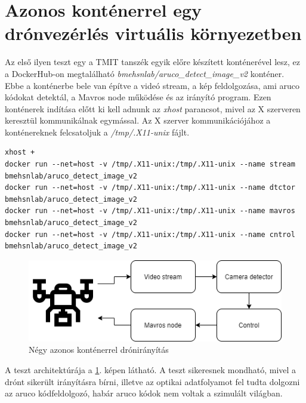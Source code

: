 \section{Azonos konténerrel egy drónvezérlés virtuális környezetben}
Az első ilyen teszt egy a TMIT tanszék egyik előre készített konténerével lesz, ez a DockerHub-on megtalálható \emph{bmehsnlab/aruco\_detect\_image\_v2} konténer. Ebbe a konténerbe bele van építve a videó stream, a kép feldolgozása, ami aruco kódokat detektál, a Mavros node működése és az irányító program.
Ezen konténerek indítása előtt ki kell adnunk az \emph{xhost} parancsot, mivel az X szerveren keresztül kommunikálnak egymással. Az X szerver kommunikációjához a konténereknek felcsatoljuk a \emph{/tmp/.X11-unix} fájlt.
\begin{lstlisting}[caption={Azonos konténerek indítása négy különböző feladattal és az X szerveren való kommunikációt megvalósítva}]
xhost +
docker run --net=host -v /tmp/.X11-unix:/tmp/.X11-unix --name stream bmehsnlab/aruco_detect_image_v2
docker run --net=host -v /tmp/.X11-unix:/tmp/.X11-unix --name dtctor bmehsnlab/aruco_detect_image_v2
docker run --net=host -v /tmp/.X11-unix:/tmp/.X11-unix --name mavros bmehsnlab/aruco_detect_image_v2
docker run --net=host -v /tmp/.X11-unix:/tmp/.X11-unix --name cntrol bmehsnlab/aruco_detect_image_v2
\end{lstlisting}
\begin{figure}
	\centering
	\includegraphics[width=\linewidth]{figures/local.png}
	\caption{Négy azonos konténerrel drónirányítás}
	\label{fig:azonos}
\end{figure}
A teszt architektúrája a \ref{fig:azonos}. képen látható. A teszt sikeresnek mondható, mivel a drónt sikerült irányításra bírni, illetve az optikai adatfolyamot fel tudta dolgozni az aruco kódfeldolgozó, habár aruco kódok nem voltak a szimulált világban.

